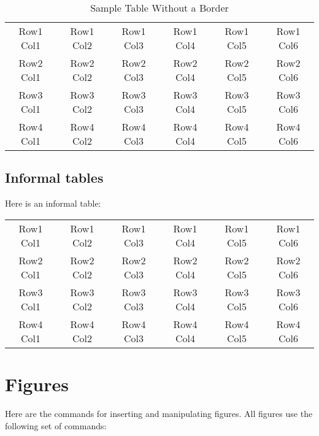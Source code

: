 \documentclass[12pt]{MUNThesisBibTeX}
\begin{document}
\begin{table}[ht]
\caption{Sample Table Without a Border}
\label{TableNoBorder}
\begin{center} %
\begin{tabular}{c c c c c c}


Row1 Col1 &Row1 Col2 &Row1 Col3 &Row1 Col4 &Row1 Col5 &Row1 Col6 \\
Row2 Col1 &Row2 Col2 &Row2 Col3 &Row2 Col4 &Row2 Col5 &Row2 Col6 \\
Row3 Col1 &Row3 Col2 &Row3 Col3 &Row3 Col4 &Row3 Col5 &Row3 Col6 \\
Row4 Col1 &Row4 Col2 &Row4 Col3 &Row4 Col4 &Row4 Col5 &Row4 Col6 \\

\end{tabular}
\end{center}
\end{table}

\subsection{Informal tables}
Here is an informal table:

\begin{center}%


\begin{tabular}{c c c c c c}

Row1 Col1 &Row1 Col2 &Row1 Col3 &Row1 Col4 &Row1 Col5 &Row1 Col6 \\
Row2 Col1 &Row2 Col2 &Row2 Col3 &Row2 Col4 &Row2 Col5 &Row2 Col6 \\
Row3 Col1 &Row3 Col2 &Row3 Col3 &Row3 Col4 &Row3 Col5 &Row3 Col6 \\
Row4 Col1 &Row4 Col2 &Row4 Col3 &Row4 Col4 &Row4 Col5 &Row4 Col6 \\

\end{tabular}
\end{center}

\section{Figures}
Here are the commands for inserting and manipulating figures. All figures use the following set of commands:\medskip
\end{document}
